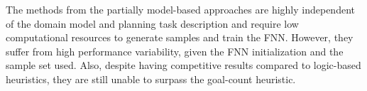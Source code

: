 The methods from the partially model-based approaches are highly independent of the domain model and planning task description and require low computational resources to generate samples and train the FNN. However, they suffer from high performance variability, given the FNN initialization and the sample set used. Also, despite having competitive results compared to logic-based heuristics, they are still unable to surpass the goal-count heuristic.
